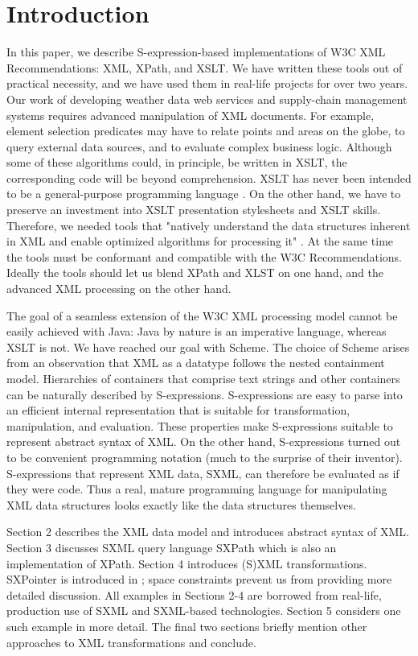 \documentclass[10pt]{llncs}
\begin{document}
\section{Introduction}
In this paper, we describe S-expression-based implementations of
W3C XML Recommendations: XML, XPath, and XSLT. We have written these
tools out of practical necessity, and we have used them in real-life
projects for over two years. Our work of developing weather data web
services and supply-chain management systems requires advanced
manipulation of XML documents. For example, element selection
predicates may have to relate points and areas on the globe, to query
external data sources, and to evaluate complex business logic. Although
some of these algorithms could, in principle, be written in XSLT, the
corresponding code will be beyond comprehension. XSLT has never been
intended to be a general-purpose programming language \cite{XSLT}. On the other hand, we have to preserve an investment into XSLT
presentation stylesheets and XSLT skills. Therefore, we needed tools
that "natively understand the data structures inherent in XML and
enable optimized algorithms for processing it" \cite{Bosworth}. At the same time the tools must be conformant and compatible with
the W3C Recommendations. Ideally the tools should let us blend XPath
and XLST on one hand, and the advanced XML processing on the other
hand.

The goal of a seamless extension of the W3C XML processing model
cannot be easily achieved with Java: Java by nature is an imperative
language, whereas XSLT is not. We have reached our goal with
Scheme. The choice of Scheme arises from an observation that XML as a
datatype follows the nested containment model. Hierarchies of
containers that comprise text strings and other containers can be
naturally described by S-expressions.  S-expressions are easy to parse
into an efficient internal representation that is suitable for
transformation, manipulation, and evaluation.  These properties make
S-expressions suitable to represent abstract syntax of XML.  On the
other hand, S-expressions turned out to be convenient programming
notation (much to the surprise of their inventor). S-expressions that
represent XML data, SXML, can therefore be evaluated as if they were
code. Thus a real, mature programming language for manipulating XML
data structures looks exactly like the data structures themselves.

Section 2 describes the XML data model and introduces abstract
syntax of XML. Section 3 discusses SXML query language SXPath which is
also an implementation of XPath. Section 4 introduces (S)XML
transformations. SXPointer is introduced in \cite{SXPointer};
space constraints prevent us from providing more detailed
discussion. All examples in Sections 2-4 are borrowed from real-life,
production use of SXML and SXML-based technologies. Section 5
considers one such example in more detail. The final two sections
briefly mention other approaches to XML transformations and
conclude.
\end{document}
